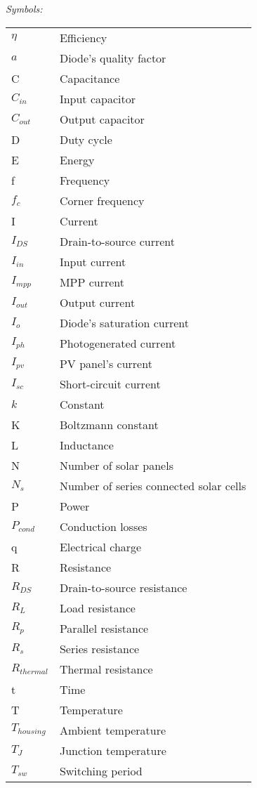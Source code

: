 \noindent\textit{Symbols:}\newline
\begin{tabular}{ll}
$\eta$ & Efficiency\\
$a$ & Diode's quality factor \\
C & Capacitance\\
$C_{in}$ & Input capacitor\\
$C_{out}$ & Output capacitor\\
D & Duty cycle\\
E & Energy\\
f & Frequency\\
$f_{c}$ & Corner frequency \\
I & Current\\
$I_{DS}$ & Drain-to-source current \\
$I_{in}$ & Input current \\
$I_{mpp}$ & MPP current\\
$I_{out}$ & Output current \\
$I_{o}$ & Diode's saturation current \\
$I_{ph}$ & Photogenerated current \\
$I_{pv}$ & PV panel's current \\
$I_{sc}$ & Short-circuit current\\
$k$ & Constant \\
K & Boltzmann constant \\
L & Inductance\\
N & Number of solar panels \\
$N_{s}$ & Number of series connected solar cells \\
P & Power\\
$P_{cond}$ & Conduction losses \\
q & Electrical charge \\
R & Resistance\\
$R_{DS}$ & Drain-to-source resistance\\
$R_{L}$ & Load resistance\\
$R_{p}$ & Parallel resistance \\
$R_{s}$ & Series resistance \\
$R_{thermal}$ & Thermal resistance\\
t & Time\\
T & Temperature \\
$T_{housing}$ & Ambient temperature \\
$T_{J}$ & Junction temperature \\
$T_{sw}$ & Switching period \\

\end{tabular}
